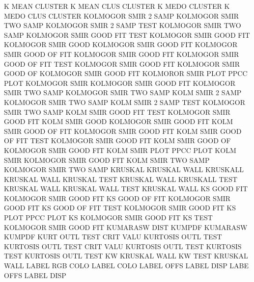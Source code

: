 K        MEAN                           CLUSTER
K        MEAN CLUS                      CLUSTER
K        MEDO                           CLUSTER
K        MEDO CLUS                      CLUSTER
KOLMOGOR SMIR 2    SAMP                 KOLMOGOR SMIR TWO  SAMP
KOLMOGOR SMIR 2    SAMP TEST            KOLMOGOR SMIR TWO  SAMP
KOLMOGOR SMIR GOOD FIT  TEST            KOLMOGOR SMIR GOOD FIT
KOLMOGOR SMIR GOOD                      KOLMOGOR SMIR GOOD FIT
KOLMOGOR SMIR GOOD OF   FIT             KOLMOGOR SMIR GOOD FIT
KOLMOGOR SMIR GOOD OF   FIT  TEST       KOLMOGOR SMIR GOOD FIT
KOLMOGOR SMIR GOOD OF                   KOLMOGOR SMIR GOOD FIT
KOLMOROR SMIR PLOT                      PPCC     PLOT
KOLMOGOR SMIR                           KOLMOGOR SMIR GOOD FIT
KOLMOGOR SMIR TWO  SAMP                 KOLMOGOR SMIR TWO  SAMP
KOLM     SMIR 2    SAMP                 KOLMOGOR SMIR TWO  SAMP
KOLM     SMIR 2    SAMP TEST            KOLMOGOR SMIR TWO  SAMP
KOLM     SMIR GOOD FIT  TEST            KOLMOGOR SMIR GOOD FIT
KOLM     SMIR GOOD                      KOLMOGOR SMIR GOOD FIT
KOLM     SMIR GOOD OF   FIT             KOLMOGOR SMIR GOOD FIT
KOLM     SMIR GOOD OF   FIT  TEST       KOLMOGOR SMIR GOOD FIT
KOLM     SMIR GOOD OF                   KOLMOGOR SMIR GOOD FIT
KOLM     SMIR PLOT                      PPCC     PLOT
KOLM     SMIR                           KOLMOGOR SMIR GOOD FIT
KOLM     SMIR TWO  SAMP                 KOLMOGOR SMIR TWO  SAMP
KRUSKAL                                 KRUSKAL  WALL
KRUSKALL                                KRUSKAL  WALL
KRUSKAL  TEST                           KRUSKAL  WALL
KRUSKALL TEST                           KRUSKAL  WALL
KRUSKAL  WALL TEST                      KRUSKAL  WALL
KS       GOOD FIT                       KOLMOGOR SMIR GOOD FIT
KS       GOOD OF   FIT                  KOLMOGOR SMIR GOOD FIT
KS       GOOD OF   FIT  TEST            KOLMOGOR SMIR GOOD FIT
KS       PLOT                           PPCC     PLOT
KS                                      KOLMOGOR SMIR GOOD FIT
KS       TEST                           KOLMOGOR SMIR GOOD FIT
KUMARASW DIST                           KUMPDF
KUMARASW                                KUMPDF
KURT     OUTL TEST CRIT VALU            KURTOSIS OUTL TEST
KURTOSIS OUTL TEST CRIT VALU            KURTOSIS OUTL TEST
KURTOSIS TEST                           KURTOSIS OUTL TEST
KW                                      KRUSKAL  WALL
KW       TEST                           KRUSKAL  WALL
LABEL    RGB  COLO                      LABEL    COLO
LABEL    OFFS                           LABEL    DISP
LABE     OFFS                           LABEL    DISP
